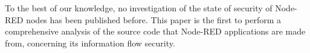 To the best of our knowledge, no investigation of the state of security of Node-RED nodes has been published before. 
This paper is the first to perform a comprehensive analysis of the source code that Node-RED applications are made from, concerning its information flow security.





